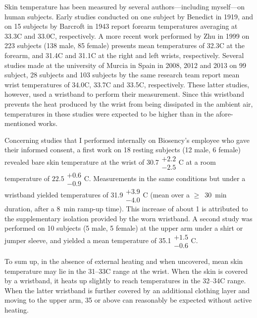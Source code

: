 Skin temperature has been measured by several authors---including myself---on human subjects. Early studies conducted on one subject by Benedict \etal{}\cite{benedict1919} in 1919, and on 15 subjects by Barcroft \etal{}\cite{barcroft1943} in 1943 report forearm temperatures averaging at 33.3{\degree}C and 33.0{\degree}C, respectively. A more recent work performed by Zhu \etal{}\cite{zhu1999} in 1999 on 223 subjects (138 male, 85 female) presents mean temperatures of 32.3{\degree}C at the forearm, and 31.4{\degree}C and 31.1{\degree}C at the right and left wrists, respectively. Several studies made at the university of Murcia in Spain in  2008\cite{sarabia2008}, 2012\cite{blazquez2012} and 2013\cite{martinez2013} on 99 subject, 28 subjects and 103 subjects by the same research team report mean wrist temperatures of 34.0{\degree}C, 33.7{\degree}C and 33.5{\degree}C, respectively. These latter studies, however, used a wristband to perform their measurement. Since this wristband prevents the heat produced by the wrist from being dissipated in the ambient air, temperatures in these studies were expected to be higher than in the afore-mentioned works.

Concerning studies that I performed internally on Biosency's employee who gave their informed consent, a first work on 18 resting subjects (12 male, 6 female) revealed bare skin temperature at the wrist of 30.7$\substack{+2.2 \\ -2.5}${\degree}C at a room temperature of $22.5\substack{+0.6 \\ -0.9}${\degree}C. Measurements in the same conditions but under a wristband yielded temperatures of 31.9$\substack{+3.9 \\ -4.0}${\degree}C (mean over a $\geq$~30~min duration, after a 8~min ramp-up time). This increase of about 1{\degree} is attributed to the supplementary isolation provided by the worn wristband. A second study was performed on 10 subjects (5 male, 5 female) at the upper arm under a shirt or jumper sleeve, and yielded a mean temperature of 35.1$\substack{+1.5 \\ -0.6}${\degree}C.

To sum up, in the absence of external heating and when uncovered, mean skin temperature may lie in the 31--33{\degree}C range at the wrist. When the skin is covered by a wristband, it heats up slightly to reach temperatures in the 32--34{\degree}C range. When the latter wristband is further covered by an additional clothing layer and moving to the upper arm, 35{\degree} or above can reasonably be expected without active heating.

